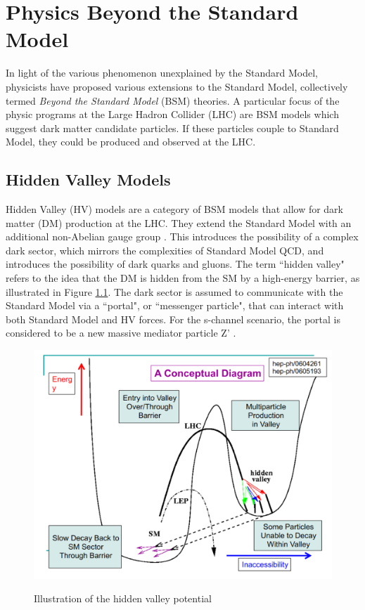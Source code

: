 \chapter{Physics Beyond the Standard Model}
In light of the various phenomenon unexplained by the Standard Model, physicists have proposed various extensions to the Standard Model, collectively termed \textit{Beyond the Standard Model} (BSM) theories. 
A particular focus of the physic programs at the Large Hadron Collider (LHC) are BSM models which suggest dark matter candidate particles. If these particles couple to Standard Model, they could be produced and observed at the LHC.

\section{Hidden Valley Models}
\label{sec:hiddenvalley}

Hidden Valley (HV) models are a category of BSM models that allow for dark matter (DM) production at the LHC. They extend the Standard Model with an additional non-Abelian gauge group \cite{snowmass}. This introduces the possibility of a complex dark sector, which mirrors the complexities of Standard Model QCD, and introduces the possibility of dark quarks and gluons. The term ``hidden valley" refers to the idea that the DM is hidden from the SM by a high-energy barrier, as illustrated in Figure \ref{fig:ch2/hidden_valley_sketch.png}. The dark sector is assumed to communicate with the Standard Model via a ``portal", or ``messenger particle", that can interact with both Standard Model and HV forces. For the s-channel scenario, the portal is considered to be a new massive mediator particle Z' . \par

\begin{figure}[h]
        \centering
	\includegraphics[width=.5\textwidth]{figures/ch2/hidden_valley_sketch.png}
        \label{fig:ch2/hidden_valley_sketch.png}
         \caption{Illustration of the hidden valley potential}
\end{figure}

